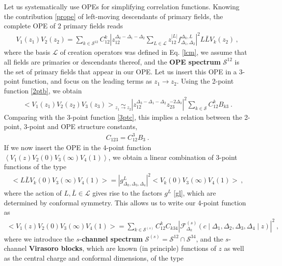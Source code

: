 \documentclass[12pt, a4paper]{article}
\newcommand{\myindex}[1]{\textbf{\boldmath #1}}
\begin{document}
Let us systematically use OPEs for simplifying correlation functions. Knowing the contribution \eqref{prope} of left-moving descendants of primary fields, the complete OPE of 2 primary fields reads 
\begin{align}
 V_1(z_1)V_2(z_2) = \sum_{k\in\mathcal{S}^{12}} C_{12}^k \left|z_{12}^{\Delta_k-\Delta_1-\Delta_2}\sum_{L\in\mathcal{L}} z_{12}^{|L|}f_{\Delta_1,\Delta_2}^{\Delta_k,L}\right|^2 L\bar L V_k(z_2)\ ,
 \label{tope}
\end{align}
where the basis $\mathcal{L}$ of creation operators was defined in Eq. \eqref{lcm},
we assume that all fields are primaries or descendants thereof, and the \myindex{OPE spectrum} $\mathcal{S}^{12}$ is the set of primary fields that appear in our OPE. Let us insert this OPE in a 3-point function, and focus on the leading terms as $z_1\to z_2$. Using the 2-point function \eqref{2ptb}, we obtain
\begin{align}
  \Big< V_1(z_1)V_2(z_2)V_3(z_3) \Big> \underset{z_1\to z_2}{\sim} 
  \left|z_{12}^{\Delta_3-\Delta_1-\Delta_2}z_{23}^{-2\Delta_3}\right|^2 
  \sum_{k\in\mathcal{S}}
  C_{12}^k B_{k3}\ .
\end{align}
Comparing with the 3-point function \eqref{3ptc}, this implies a relation between the 2-point, 3-point and OPE structure constants,
\begin{align}
 \boxed{C_{123} = C_{12}^3B_{3}} \ .
 \label{ccb}
\end{align}
If we now insert the OPE in the 4-point function $\left<V_1(z)V_2(0)V_3(\infty)V_4(1)\right>$, we obtain a linear combination of 3-point functions of the type 
\begin{align}
 \Big<L\bar{L}V_k(0) V_3(\infty)V_4(1)\Big> = \left|g^L_{\Delta_k,\Delta_3,\Delta_4}\right|^2 \Big<V_k(0) V_3(\infty)V_4(1)\Big>\ ,
\end{align}
where the action of $L,\bar L\in\mathcal{L}$ gives rise to the factors $g^L$ \eqref{gl}, which are determined by conformal symmetry. 
This allows us to write our 4-point function as 
\begin{align}
 \boxed{\Big<V_1(z)V_2(0)V_3(\infty)V_4(1)\Big> = \sum_{k\in\mathcal{S}^{(s)}} C_{12}^k C_{k34} \left|\mathcal{F}^{(s)}_{\Delta_k}\left(c\middle|\Delta_1,\Delta_2,\Delta_3,\Delta_4\middle|z\right)\right|^2}  \ ,
 \label{sdec}
\end{align}
where we introduce the $s$-\myindex{channel spectrum} $\mathcal{S}^{(s)}= \mathcal{S}^{12}\cap \mathcal{S}^{34}$, and the $s$-channel \myindex{Virasoro blocks}, which are known (in principle) functions of $z$ as well as the central charge and conformal dimensions, of the type
\end{document}
